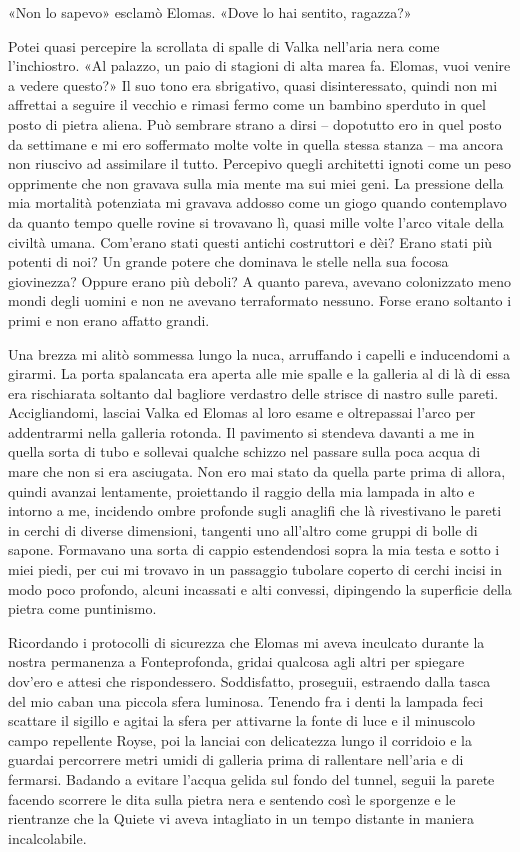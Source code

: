«Non lo sapevo» esclamò Elomas. «Dove lo hai sentito, ragazza?»

Potei quasi percepire la scrollata di spalle di Valka nell'aria nera
come l'inchiostro. «Al palazzo, un paio di stagioni di alta marea fa.
Elomas, vuoi venire a vedere questo?» Il suo tono era sbrigativo, quasi
disinteressato, quindi non mi affrettai a seguire il vecchio e rimasi
fermo come un bambino sperduto in quel posto di pietra aliena. Può
sembrare strano a dirsi -- dopotutto ero in quel posto da settimane e mi
ero soffermato molte volte in quella stessa stanza -- ma ancora non
riuscivo ad assimilare il tutto. Percepivo quegli architetti ignoti come
un peso opprimente che non gravava sulla mia mente ma sui miei geni. La
pressione della mia mortalità potenziata mi gravava addosso come un
giogo quando contemplavo da quanto tempo quelle rovine si trovavano lì,
quasi mille volte l'arco vitale della civiltà umana. Com'erano stati
questi antichi costruttori e dèi? Erano stati più potenti di noi? Un
grande potere che dominava le stelle nella sua focosa giovinezza? Oppure
erano più deboli? A quanto pareva, avevano colonizzato meno mondi degli
uomini e non ne avevano terraformato nessuno. Forse erano soltanto i
primi e non erano affatto grandi.

Una brezza mi alitò sommessa lungo la nuca, arruffando i capelli e
inducendomi a girarmi. La porta spalancata era aperta alle mie spalle e
la galleria al di là di essa era rischiarata soltanto dal bagliore
verdastro delle strisce di nastro sulle pareti. Accigliandomi, lasciai
Valka ed Elomas al loro esame e oltrepassai l'arco per addentrarmi nella
galleria rotonda. Il pavimento si stendeva davanti a me in quella sorta
di tubo e sollevai qualche schizzo nel passare sulla poca acqua di mare
che non si era asciugata. Non ero mai stato da quella parte prima di
allora, quindi avanzai lentamente, proiettando il raggio della mia
lampada in alto e intorno a me, incidendo ombre profonde sugli anaglifi
che là rivestivano le pareti in cerchi di diverse dimensioni, tangenti
uno all'altro come gruppi di bolle di sapone. Formavano una sorta di
cappio estendendosi sopra la mia testa e sotto i miei piedi, per cui mi
trovavo in un passaggio tubolare coperto di cerchi incisi in modo poco
profondo, alcuni incassati e alti convessi, dipingendo la superficie
della pietra come puntinismo.

Ricordando i protocolli di sicurezza che Elomas mi aveva inculcato
durante la nostra permanenza a Fonteprofonda, gridai qualcosa agli altri
per spiegare dov'ero e attesi che rispondessero. Soddisfatto, proseguii,
estraendo dalla tasca del mio caban una piccola sfera luminosa. Tenendo
fra i denti la lampada feci scattare il sigillo e agitai la sfera per
attivarne la fonte di luce e il minuscolo campo repellente Royse, poi la
lanciai con delicatezza lungo il corridoio e la guardai percorrere metri
umidi di galleria prima di rallentare nell'aria e di fermarsi. Badando a
evitare l'acqua gelida sul fondo del tunnel, seguii la parete facendo
scorrere le dita sulla pietra nera e sentendo così le sporgenze e le
rientranze che la Quiete vi aveva intagliato in un tempo distante in
maniera incalcolabile.

